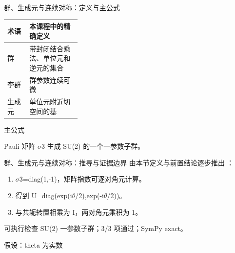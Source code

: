 \begin{frame}[t]{群、生成元与连续对称：定义与主公式}
\footnotesize\begin{tabularx}{\linewidth}{p{0.30\linewidth}Y}
\toprule 术语 & 本课程中的精确定义\\\midrule
{} 群 & 带封闭结合乘法、单位元和逆元的集合\\
 李群 & 群参数连续可微\\
 生成元 & 单位元附近切空间的基\\
\bottomrule\end{tabularx}\vspace{0.15cm}
\begin{block}{ 主公式}\centering{}\end{block}
Pauli 矩阵 \ensuremath{\sigma}3 生成 SU(2) 的一个一参数子群。
\end{frame}

\begin{frame}[t]{群、生成元与连续对称：推导与证据边界}
\footnotesize
{}\quad 由本节定义与前置结论逐步推出 ：
\begin{enumerate}
\item \ensuremath{\sigma}3=diag(1,-1)，矩阵指数可逐对角元计算。
\item 得到 U=diag(exp(i\ensuremath{\theta}/\allowbreak{}2),exp(-i\ensuremath{\theta}/\allowbreak{}2))。
\item 与共轭转置相乘为 I，两对角元乘积为 1。
\end{enumerate}\begin{block}{可执行检查}
\quad SU(2) 一参数子群；3/3 项通过；SymPy exact。
\par\scriptsize 假设：theta 为实数
\end{block}
\end{frame}

